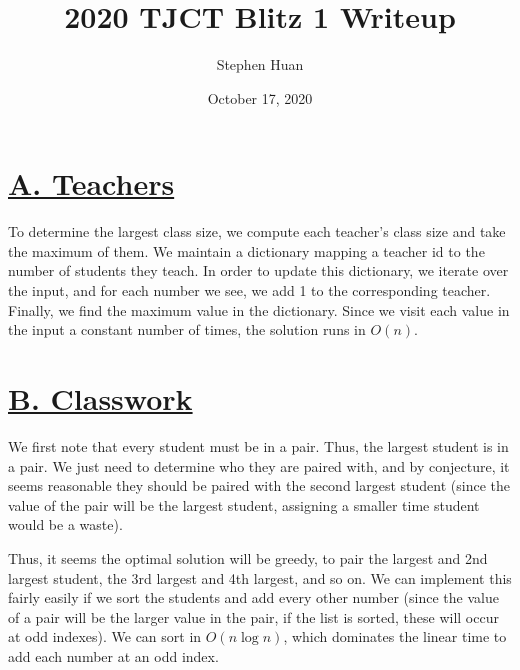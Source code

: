 \documentclass[11pt, oneside]{article}
\title{2020 TJCT Blitz 1 Writeup}
\author{Stephen Huan}
\date{October 17, 2020}
\theoremstyle{plain}
\theoremstyle{definition}
\begin{document}
\maketitle

\section{\href{https://codeforces.com/group/M4wsRWBHyZ/contest/299371/problem/A}
{A. Teachers}}
To determine the largest class size, we compute each teacher's class size
and take the maximum of them. We maintain a dictionary mapping a teacher id
to the number of students they teach. In order to update this dictionary,
we iterate over the input, and for each number we see, we add 1 to the
corresponding teacher. Finally, we find the maximum value in the dictionary.  
Since we visit each value in the input a constant number of times,
the solution runs in \( O(n) \).

\section{\href{https://codeforces.com/group/M4wsRWBHyZ/contest/299371/problem/B}
{B. Classwork}}
We first note that every student must be in a pair.
Thus, the largest student is in a pair. We just need to determine who they are
paired with, and by conjecture, it seems reasonable they should be paired with
the second largest student (since the value of the pair will be the largest 
student, assigning a smaller time student would be a waste).

Thus, it seems the optimal solution will be greedy, to pair the largest and
2nd largest student, the 3rd largest and 4th largest, and so on.
We can implement this fairly easily if we sort the students and add every
other number (since the value of a pair will be the larger value in the pair,
if the list is sorted, these will occur at odd indexes).
We can sort in \( O(n \log n) \), which dominates the linear time to 
add each number at an odd index. 
\end{document}
